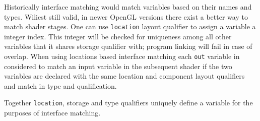 Historically interface matching would match variables based on their names and types.
Wiliest still valid, in newer OpenGL versions there exist a better way to match shader stages. 
One can use \texttt{location} layout qualifier to assign a variable a integer index.
This integer will be checked for uniqueness among all other variables that it shares storage qualifier with; program linking will fail in case of overlap.
When using locations based interface matching each \texttt{out} variable in considered to match an input variable in the subsequent shader if
the two variables are declared with the same location and component layout qualifiers and match in type and qualification.

Together \texttt{location}, storage and type qualifiers uniquely define a variable for the purposes of interface matching.
